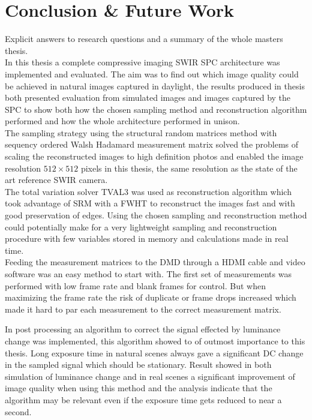 \section{Conclusion \& Future Work}
\label{sec:conclusions_and_fw}
Explicit answers to research questions and a summary of the whole masters thesis.\\[0.1in]

In this thesis a complete compressive imaging SWIR SPC architecture was implemented and evaluated. The aim was to find out which image quality could be achieved in natural images captured in daylight, the results produced in thesis both presented evaluation from simulated images and images captured by the SPC to show both how the chosen sampling method and reconstruction algorithm performed and how the whole architecture performed in unison.\\[0.1in]

The sampling strategy using the structural random matrices method with sequency ordered Walsh Hadamard measurement matrix solved the problems of scaling the reconstructed images to high definition photos and enabled the image resolution $512 \times 512$ pixels in this thesis, the same resolution as the state of the art reference SWIR camera.\\[0.1in]

The total variation solver TVAL3 was used as reconstruction algorithm  which took advantage of SRM with a FWHT to reconstruct the images fast and with good preservation of edges. Using the chosen sampling and reconstruction method could potentially make for a very lightweight sampling and reconstruction procedure with few variables stored in memory and calculations made in real time.\\[0.1in]

Feeding the measurement matrices to the DMD through a HDMI cable and video software was an easy method to start with. The first set of measurements was performed with low frame rate and blank frames for control. But when maximizing the frame rate the risk of duplicate or frame drops increased which made it hard to par each measurement to the correct measurement matrix. 

In post processing an algorithm to correct the signal effected by luminance change was implemented, this algorithm showed to of outmost importance to this thesis. Long exposure time in natural scenes always gave a significant DC change in the sampled signal which should be stationary. Result showed in both simulation of luminance change and in real scenes a significant improvement of image quality when using this method and the analysis indicate that the algorithm may be relevant even if the exposure time gets reduced to near a second.\\[0.1in]

